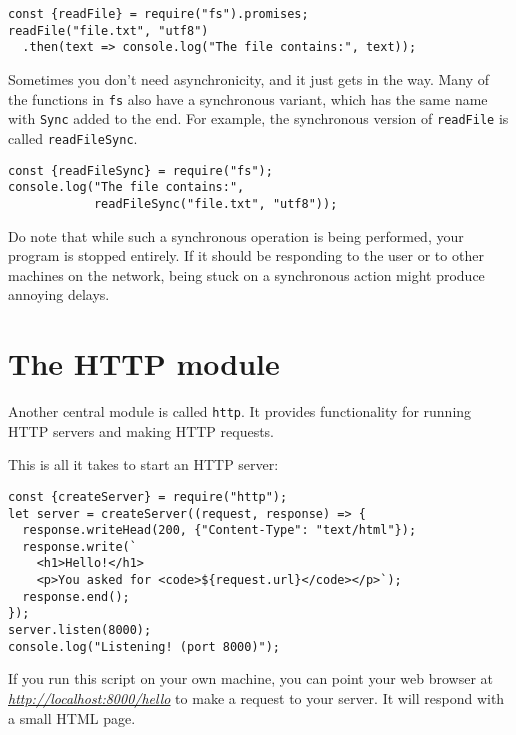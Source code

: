 \begin{lstlisting}
const {readFile} = require("fs").promises;
readFile("file.txt", "utf8")
  .then(text => console.log("The file contains:", text));
\end{lstlisting}
\noindent{}

Sometimes you don't need asynchronicity, and it just gets in the way. Many of the functions in \lstinline`fs` also have a synchronous variant, which has the same name with \lstinline`Sync` added to the end. For example, the synchronous version of \lstinline`readFile` is called \lstinline`readFileSync`.

\begin{lstlisting}
const {readFileSync} = require("fs");
console.log("The file contains:",
            readFileSync("file.txt", "utf8"));
\end{lstlisting}
\noindent{}

Do note that while such a synchronous operation is being performed, your program is stopped entirely. If it should be responding to the user or to other machines on the network, being stuck on a synchronous action might produce annoying delays.

\section{The HTTP module}

Another central module is called \lstinline`http`. It provides functionality for running HTTP servers and making HTTP requests.

This is all it takes to start an HTTP server:

\begin{lstlisting}
const {createServer} = require("http");
let server = createServer((request, response) => {
  response.writeHead(200, {"Content-Type": "text/html"});
  response.write(`
    <h1>Hello!</h1>
    <p>You asked for <code>${request.url}</code></p>`);
  response.end();
});
server.listen(8000);
console.log("Listening! (port 8000)");
\end{lstlisting}
\noindent{}

If you run this script on your own machine, you can point your web browser at \href{http://localhost:8000/hello}{\emph{http://localhost:8000\slash hello}} to make a request to your server. It will respond with a small HTML page.

